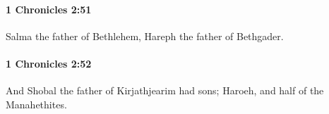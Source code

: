 		\paragraph{1 Chronicles 2:51} %
			\label{1CHRONICLES-2-51}

			Salma the father of Bethlehem, Hareph the father of Bethgader.


		\paragraph{1 Chronicles 2:52} %
			\label{1CHRONICLES-2-52}

			And Shobal the father of Kirjathjearim had sons; Haroeh, and half of the Manahethites.


